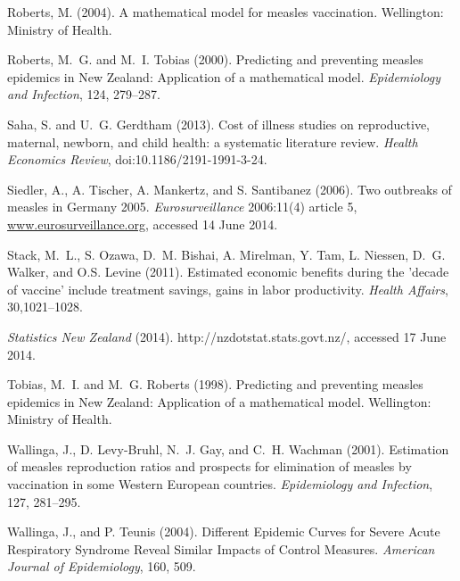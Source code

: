 \documentclass{article}
\begin{document}
\begin{thebibliography}{}
Roberts, M. (2004).
\newblock A mathematical model for measles vaccination.
\newblock Wellington: Ministry of Health.

Roberts, M.~G. and M.~I. Tobias (2000).
\newblock Predicting and preventing measles epidemics in New Zealand: Application of a mathematical model. 
\newblock \emph{Epidemiology and Infection}, 124, 279--287.

Saha, S. and U.~G. Gerdtham (2013).
\newblock Cost of illness studies on reproductive, maternal, newborn, and child health: a systematic literature review.
\newblock \emph{Health Economics Review}, doi:10.1186/2191-1991-3-24.

Siedler, A., A. Tischer, A. Mankertz, and S. Santibanez (2006).
\newblock Two outbreaks of measles in Germany 2005.
\newblock \emph{Eurosurveillance} 2006:11(4) article 5, \href{http://www.eurosurveillance.org/ViewArticle.aspx?ArticleId=615}{www.eurosurveillance.org}, accessed 14 June 2014.

Stack, M.~L., S. Ozawa, D.~M. Bishai, A. Mirelman, Y. Tam, L. Niessen, D.~G. Walker, and O.S. Levine (2011).
\newblock Estimated economic benefits during the 'decade of vaccine' include treatment savings, gains in labor productivity.
\newblock \emph{Health Affairs}, 30,1021--1028.

\newblock \emph{Statistics New Zealand} (2014).
http://nzdotstat.stats.govt.nz/, accessed 17 June 2014.

Tobias, M.~I. and M.~G. Roberts (1998).
\newblock Predicting and preventing measles epidemics in New Zealand: Application of a mathematical model.
\newblock Wellington: Ministry of Health.

Wallinga, J., D. Levy-Bruhl, N.~J. Gay, and C.~H. Wachman (2001).
\newblock Estimation of measles reproduction ratios and prospects for elimination of measles by vaccination in some Western European countries.
\newblock \emph{Epidemiology and Infection}, 127, 281--295.

Wallinga, J., and P. Teunis (2004).
\newblock Different Epidemic Curves for Severe Acute Respiratory Syndrome Reveal Similar Impacts of Control Measures.
\newblock \emph{American Journal of Epidemiology}, 160, 509.


\end{thebibliography}
\end{document}
